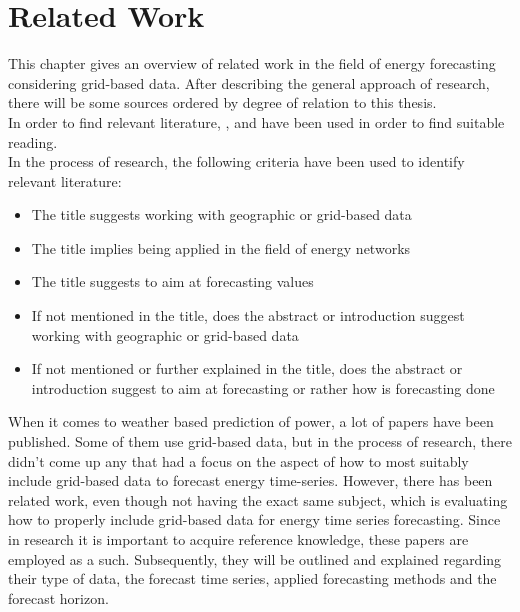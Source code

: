 \chapter{Related Work}
\label{ch:RW}

This chapter gives an overview of related work in the field of energy forecasting considering grid-based data. After describing the general approach of research, there will be some sources ordered by degree of relation to this thesis.\\

In order to find relevant literature, , and  have been used in order to find suitable reading.\\
In the process of research, the following criteria have been used to identify relevant literature:
\begin{itemize}
  \item The title suggests working with geographic or grid-based data
  \item The title implies being applied in the field of energy networks
  \item The title suggests to aim at forecasting values
  \item If not mentioned in the title, does the abstract or introduction suggest working with geographic or grid-based data
  \item If not mentioned or further explained in the title, does the abstract or introduction suggest to aim at forecasting or rather how is forecasting done
\end{itemize}

When it comes to weather based prediction of power, a lot of papers have been published. Some of them use grid-based data, but in the process of research, there didn't come up any that had a focus on the aspect of how to most suitably include grid-based data to forecast energy time-series. However, there has been related work, even though not having the exact same subject, which is evaluating how to properly include grid-based data for energy time series forecasting. Since in research it is important to acquire reference knowledge, these papers are employed as a such. Subsequently, they will be outlined and explained regarding their type of data, the forecast time series, applied forecasting methods and the forecast horizon.\\


